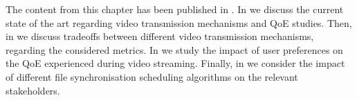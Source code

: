 The content from this chapter has been published in \cite{Schwartz2013b, Hossfeld2015, Schwartz2014a}.
In  we discuss the current state of the art regarding video transmission mechanisms and \gls{QoE} studies.
Then, in  we discuss tradeoffs between different video transmission mechanisms, regarding the considered metrics.
In  we study the impact of user preferences on the \gls{QoE} experienced during video streaming.
Finally, in  we consider the impact of different file synchronisation scheduling algorithms on the relevant stakeholders.





